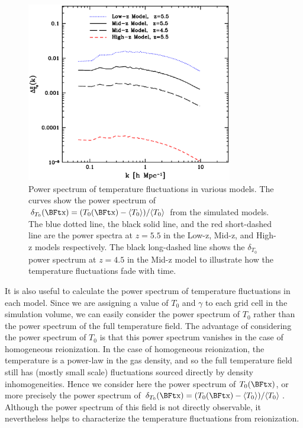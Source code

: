 \begin{figure}
\bc
\includegraphics[width=9cm]{f7.eps}
\caption{Power spectrum of temperature fluctuations in various models. The curves show the power spectrum of 
$\delta_{T_0}(\x) = (T_0(\x) - \avg{T_0})/\avg{T_0}$ from the simulated models. The blue dotted line, the black solid line, and the red short-dashed line
are the power spectra at $z=5.5$ in the Low-z, Mid-z, and High-z models respectively. The black long-dashed line
shows the $\delta_{T_0}$ power spectrum at $z=4.5$ in the Mid-z model to illustrate how the temperature fluctuations fade with
time.}
\label{fig:power_tzero}
\ec
\end{figure}

It is also useful to calculate the power spectrum of temperature fluctuations in each model. Since we are assigning
a value of $T_0$ and $\gamma$ to each grid cell in the simulation volume, we can easily consider the power 
spectrum of $T_0$ rather
than the power spectrum of the full temperature field. The advantage of considering the power spectrum of $T_0$ is that this power
spectrum
vanishes in the case of homogeneous reionization. In the case of homogeneous reionization, the 
temperature is a power-law in the gas density, and so the full temperature field still has (mostly small scale)
fluctuations sourced directly by density inhomogeneities. Hence we consider here the power spectrum of $T_0(\x)$, or more
precisely the power spectrum of $\delta_{T_0}(\x) = (T_0(\x) - \avg{T_0})/\avg{T_0}$. Although the power spectrum of this field
is not directly observable, it nevertheless helps to characterize the temperature fluctuations from reionization.
 
